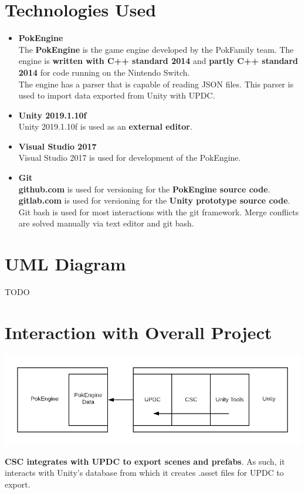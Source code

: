 \documentclass[12pt,a4paper]{article}
\begin{document}
\section{Technologies Used}
\begin{itemize}
	\item \textbf{PokEngine}\\
		The \textbf{PokEngine} is the game engine developed by the PokFamily team. The engine is \textbf{written with C++ standard 2014} and \textbf{partly C++ standard 2014} for code running on the Nintendo Switch.\\
The engine has a parser that is capable of reading JSON files. This parser is used to import data exported from Unity with UPDC.

	\item \textbf{Unity 2019.1.10f}\\
		Unity 2019.1.10f is used as an \textbf{external editor}.
	
	\item \textbf{Visual Studio 2017}\\
		Visual Studio 2017 is used for development of the PokEngine.
	
	\item \textbf{Git}\\
		\textbf{github.com} is used for versioning for the \textbf{PokEngine source code}. \textbf{gitlab.com} is used for versioning for the \textbf{Unity prototype source code}. Git bash is used for most interactions with the git framework. Merge conflicts are solved manually via text editor and git bash.		
\end{itemize}
\newpage

\section{UML Diagram}
TODO

\section{Interaction with Overall Project}
\begin{center}
\includegraphics[scale=0.5]{CSCLocation}
\end{center}
\textbf{CSC integrates with UPDC to export scenes and prefabs}. As such, it interacts with Unity's database from which it creates .asset files for UPDC to export.
\end{document}
